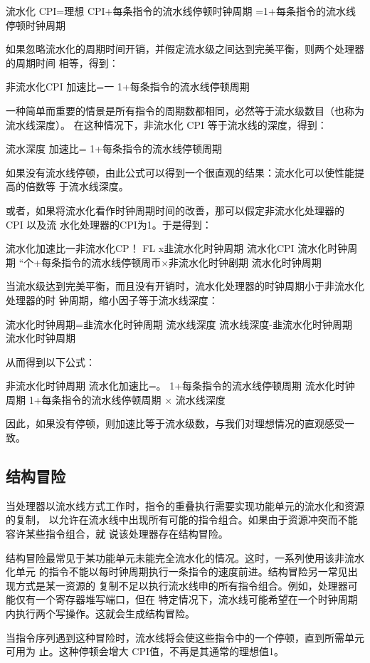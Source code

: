 流水化 CPI=理想 CPI+每条指令的流水线停顿时钟周期
=1+每条指令的流水线停顿时钟周期

如果忽略流水化的周期时间开销，并假定流水级之间达到完美平衡，则两个处理器的周期时间
相等，得到：

非流水化CPI
加速比=一
1+每条指令的流水线停顿周期

一种简单而重要的情景是所有指令的周期数都相同，必然等于流水级数目（也称为流水线深度）。
在这种情况下，非流水化 CPI 等于流水线的深度，得到：

流水深度
加速比=
1+每条指令的流水线停顿周期

如果没有流水线停顿，由此公式可以得到一个很直观的结果：流水化可以使性能提高的倍数等
于流水线深度。

或者，如果将流水化看作时钟周期时间的改善，那可以假定非流水化处理器的 CPI 以及流
水化处理器的CPI为1。于是得到：

流水化加速比一非流水化CP！
FL x韭流水化时钟周期
流水化CPI
流水化时钟周期
“个+每条指令的流水线停顿周币×非流水化时钟剧期
流水化时钟周期

当流水级达到完美平衡，而且没有开销时，流水化处理器的时钟周期小于非流水化处理器的时
钟周期，缩小因子等于流水线深度：

流水化时钟周期=韭流水化时钟周期
流水线深度
流水线深度-韭流水化时钟周期
流水化时钟周期

从而得到以下公式：

非流水化时钟周期
流水化加速比=。
1+每条指令的流水线停顿周期
流水化时钟周期
1+每条指令的流水线停顿周期
× 流水线深度

因此，如果没有停顿，则加速比等于流水级数，与我们对理想情况的直观感受一致。

\subsection{结构冒险}
当处理器以流水线方式工作时，指令的重叠执行需要实现功能单元的流水化和资源的复制，
以允许在流水线中出现所有可能的指令组合。如果由于资源冲突而不能容许某些指令组合，就
说该处理器存在结构冒险。

结构冒险最常见于某功能单元未能完全流水化的情况。这时，一系列使用该非流水化单元
的指令不能以每时钟周期执行一条指令的速度前进。结构冒险另一常见出现方式是某一资源的
复制不足以执行流水线申的所有指令组合。例如，处理器可能仅有一个寄存器堆写端口，但在
特定情况下，流水线可能希望在一个时钟周期内执行两个写操作。这就会生成结构冒险。

当指令序列遇到这种冒险时，流水线将会使这些指令中的一个停顿，直到所需单元可用为
止。这种停顿会增大 CPI值，不再是其通常的理想值1。


